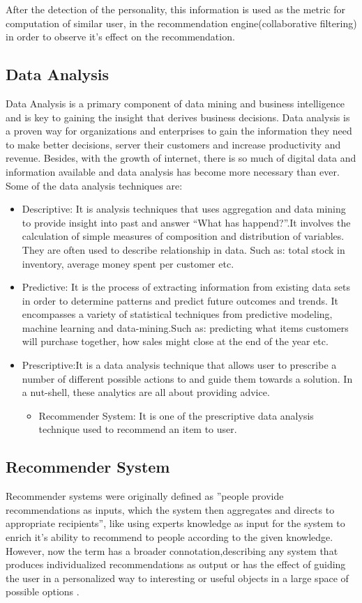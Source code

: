 After the detection of the personality, this information is used as the metric for computation of similar user, in the recommendation engine(collaborative filtering) in order to observe it's effect on the recommendation.

\subsection{Data Analysis}
Data Analysis \cite{analysis} is a primary component of data mining and business intelligence and is key to gaining the insight that derives business decisions. Data analysis is a proven way for organizations and enterprises to gain the information they need to make better decisions, server their customers and increase productivity and revenue. Besides, with the growth of internet, there is so much of digital data and information available and data analysis has become more necessary than ever.
Some of the data analysis techniques are:
\begin{itemize}
	\item Descriptive: It is analysis techniques that uses aggregation and data mining to provide insight into past and answer ``What has happend?''.It involves the calculation of simple measures of composition and distribution of variables. They are often used to describe relationship in data. Such as: total stock in inventory, average money spent per customer etc.
	\item Predictive: It is the process of extracting information from existing data sets in order to determine patterns and predict future outcomes and trends. It encompasses a variety of statistical techniques from predictive modeling, machine learning and data-mining.Such as: predicting what items customers will purchase together, how sales might close at the end of the year etc.
	\item Prescriptive:It is a data analysis technique that allows user to prescribe a number of different possible actions to and guide them towards a solution. In a nut-shell, these analytics are all about providing advice.
		\begin{itemize}
			\item Recommender System: It is one of the prescriptive data analysis technique used to recommend an item to user.
		\end{itemize}
	\end{itemize}
\subsection{Recommender System}
Recommender systems were originally defined as ''people provide recommendations as inputs, which the system then aggregates and directs to appropriate recipients'', like using experts knowledge as input for the system to enrich it's ability to recommend to people according to the given knowledge. However, now the term has a broader connotation,describing any system that produces individualized recommendations as output or has the effect of guiding the user in a personalized way to interesting or useful objects in a large space of possible options \cite{rdef}.

